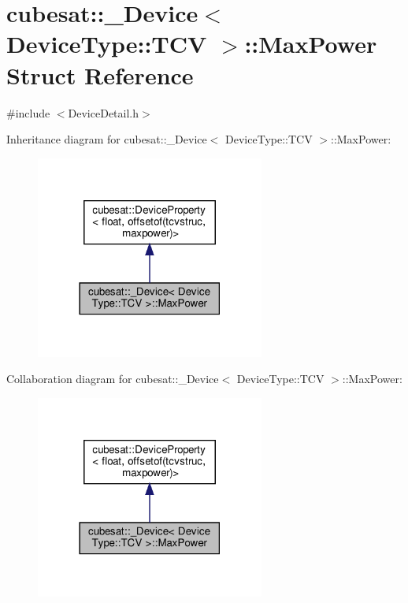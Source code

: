\hypertarget{structcubesat_1_1__Device_3_01DeviceType_1_1TCV_01_4_1_1MaxPower}{}\section{cubesat\+:\+:\+\_\+\+Device$<$ Device\+Type\+:\+:T\+CV $>$\+:\+:Max\+Power Struct Reference}
\label{structcubesat_1_1__Device_3_01DeviceType_1_1TCV_01_4_1_1MaxPower}


{\ttfamily \#include $<$Device\+Detail.\+h$>$}



Inheritance diagram for cubesat\+:\+:\+\_\+\+Device$<$ Device\+Type\+:\+:T\+CV $>$\+:\+:Max\+Power\+:\nopagebreak
\begin{figure}[H]
\begin{center}
\leavevmode
\includegraphics[width=213pt]{structcubesat_1_1__Device_3_01DeviceType_1_1TCV_01_4_1_1MaxPower__inherit__graph}
\end{center}
\end{figure}


Collaboration diagram for cubesat\+:\+:\+\_\+\+Device$<$ Device\+Type\+:\+:T\+CV $>$\+:\+:Max\+Power\+:\nopagebreak
\begin{figure}[H]
\begin{center}
\leavevmode
\includegraphics[width=213pt]{structcubesat_1_1__Device_3_01DeviceType_1_1TCV_01_4_1_1MaxPower__coll__graph}
\end{center}
\end{figure}
